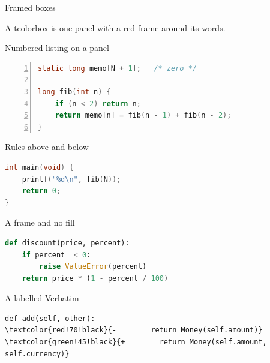 \documentclass{beamer}
\begin{document}
\begin{frame}{Framed boxes}

\vspace{1em}
\begin{tcolorbox}[colback=red!5,colframe=red!60!black,boxrule=1pt,arc=0pt,sharp corners]
A tcolorbox is one panel with a red frame around its words.
\end{tcolorbox}
\end{frame}

\begin{frame}[fragile]{Numbered listing on a panel}
\begin{lstlisting}[language=C,backgroundcolor=\color{codebg},numbers=left,numberstyle=\tiny\color{gray},
                   xleftmargin=2em,framexleftmargin=1.5em]
static long memo[N + 1];   /* zero */

long fib(int n) {
    if (n < 2) return n;
    return memo[n] = fib(n - 1) + fib(n - 2);
}
\end{lstlisting}
\end{frame}

\begin{frame}[fragile]{Rules above and below}
\begin{lstlisting}[language=C,frame=lines,backgroundcolor=\color{white}]
int main(void) {
    printf("%d\n", fib(N));
    return 0;
}
\end{lstlisting}
\end{frame}

\begin{frame}[fragile]{A frame and no fill}
\begin{lstlisting}[language=Python]
def discount(price, percent):
    if percent  < 0:
        raise ValueError(percent)
    return price * (1 - percent / 100)
\end{lstlisting}
\end{frame}

\begin{frame}[fragile]{A labelled Verbatim}
\begin{Verbatim}[frame=single,fontsize=\small,commandchars=\\\{\},label={money.py}]
     def add(self, other):
\textcolor{red!70!black}{-        return Money(self.amount)}
\textcolor{green!45!black}{+        return Money(self.amount, self.currency)}
\end{Verbatim}
\end{frame}
\end{document}
